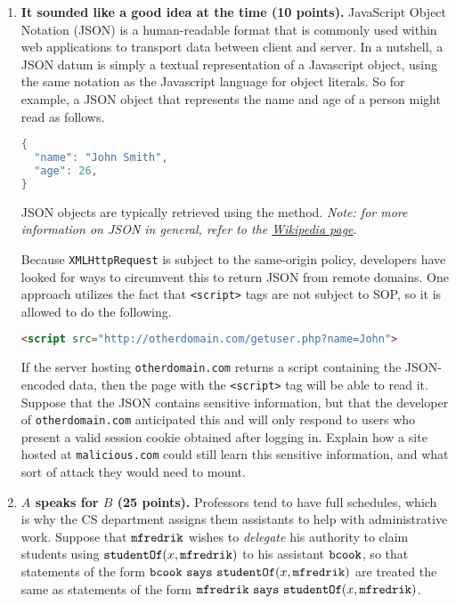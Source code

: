 \documentclass[10pt]{article}
\newcommand{\studof}{\ensuremath{\keywordfont{studentOf}}}
\newcommand{\matt}{\ensuremath{\keywordfont{mfredrik}}\xspace}
\newcommand{\ben}{\ensuremath{\keywordfont{bcook}}\xspace}
\begin{document}
\begin{enumerate}
\item \textbf{It sounded like a good idea at the time (10 points).} JavaScript Object Notation (JSON) is a human-readable format that is commonly used within web applications to transport data between client and server. In a nutshell, a JSON datum is simply a textual representation of a Javascript object, using the same notation as the Javascript language for object literals. So for example, a JSON object that represents the name and age of a person might read as follows.
\begin{lstlisting}[language=Java]
{
  "name": "John Smith",
  "age": 26,
}
\end{lstlisting}
JSON objects are typically retrieved using the \href{https://en.wikipedia.org/wiki/XMLHttpRequest}{} method.
\emph{Note: for more information on JSON in general, refer to the \href{https://en.wikipedia.org/wiki/JSON}{Wikipedia page}}.

Because \verb'XMLHttpRequest' is subject to the same-origin policy, developers have looked for ways to circumvent this to return JSON from remote domains. One approach utilizes the fact that \verb'<script>' tags are not subject to SOP, so it is allowed to do the following.
\begin{lstlisting}[language=HTML]
<script src="http://otherdomain.com/getuser.php?name=John">
\end{lstlisting}
If the server hosting \verb'otherdomain.com' returns a script containing the JSON-encoded data, then the page with the \verb'<script>' tag will be able to read it. Suppose that the JSON contains sensitive information, but that the developer of \verb'otherdomain.com' anticipated this and will only respond to users who present a valid session cookie obtained after logging in. Explain how a site hosted  at \verb'malicious.com' could still learn this sensitive information, and what sort of attack they would need to mount.

\newpage

\item \textbf{$A$ speaks for $B$ (25 points).} Professors tend to have full schedules, which is why the CS department assigns them assistants to help with administrative work. Suppose that \matt wishes to \emph{delegate} his authority to claim students using $\studof(x,\matt)$ to his assistant \ben, so that statements of the form $\says{\ben}{\studof(x,\matt)}$ are treated the same as statements of the form $\says{\matt}{\studof(x,\matt)}$.


\end{enumerate}
\end{document}
